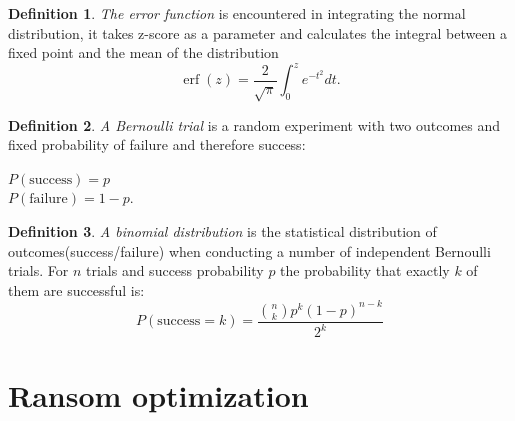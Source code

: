 \documentclass[11pt, a4paper]{article}
\theoremstyle{definition}
\newtheorem{definition}{Definition}
\begin{document}
		\begin{definition}
			\label{def:err}
			\emph{The error function} is encountered in integrating the normal distribution, it takes z-score as a parameter and calculates the integral between a fixed point and the mean of the distribution
			$$\operatorname{erf}(z)=\dfrac{2}{\sqrt{\pi}}\int_{0}^{z}e^{-t^{2}}dt.$$
		\end{definition}
	
		\begin{definition}
			\label{def:Bernoulli_trial}
			\emph{A Bernoulli trial} is a random experiment with two outcomes and fixed probability of failure and therefore success:
			\begin{center}
			$P(\text{success})=p$\\
			$P(\text{failure})=1-p.$
			\end{center}
		\end{definition}
	
		\begin{definition}
			\label{def:Binomial_distribution}
			\emph{A binomial distribution} is the statistical distribution of outcomes(success/failure) when conducting a number of independent Bernoulli trials.
			For $n$ trials and success probability $p$ the probability that exactly $k$ of them are successful is:
			$$
			P(\text{success} = k) = \frac{\binom{n}{k}p^{k}(1-p)^{n-k}}{2^k}
			$$
		\end{definition}
\newpage
	\section{Ransom optimization}
\end{document}
